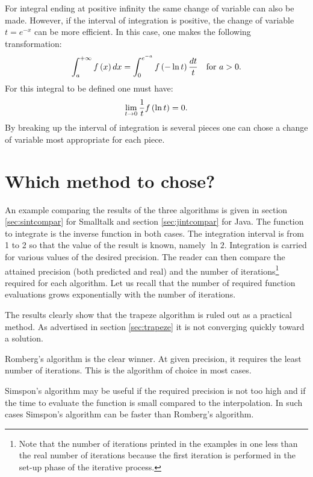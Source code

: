 \documentclass[twoside]{book}
\begin{document}
For integral ending at positive infinity the same change of
variable can also be made. However, if the interval of integration
is positive, the change of variable $t=e^{-x}$ can be more
efficient. In this case, one makes the following transformation:
\begin{equation}
\int_a^{+\infty} f\left(x\right)dx=\int_0^{e^{-a}}f\left(-\ln t
\right){dt \over t}\mbox{\quad for $a>0$}.
\end{equation}
For this integral to be defined one must have:
\begin{equation}
  \lim_{t \to 0}{1\over t}f\left(\ln
  t\right)=0.
\end{equation}
By breaking up the interval of integration is several pieces one
can chose a change of variable most appropriate for each piece.

\section{Which method to chose?}
\label{sec:intwhich} An example comparing the results of the three
algorithms is given in section \ref{sec:sintcompar} for Smalltalk
and section \ref{sec:jintcompar} for Java. The function to
integrate is the inverse function in both cases. The integration
interval is from 1 to 2 so that the value of the result is known,
namely $\ln 2$. Integration is carried for various values of the
desired precision. The reader can then compare the attained
precision (both predicted and real) and the number of
iterations\footnote{Note that the number of iterations printed in
the examples in one less than the real number of iterations
because the first iteration is performed in the set-up phase of
the iterative process.} required for each algorithm. Let us recall
that the number of required function evaluations grows
exponentially with the number of iterations.

The results clearly show that the trapeze algorithm is ruled out
as a practical method. As advertised in section \ref{sec:trapeze}
it is not converging quickly toward a solution.

Romberg's algorithm is the clear winner. At given precision, it
requires the least number of iterations. This is the algorithm of
choice in most cases.

Simspon's algorithm may be useful if the required precision is not
too high and if the time to evaluate the function is small
compared to the interpolation. In such cases Simspon's algorithm
can be faster than Romberg's algorithm.
\end{document}
